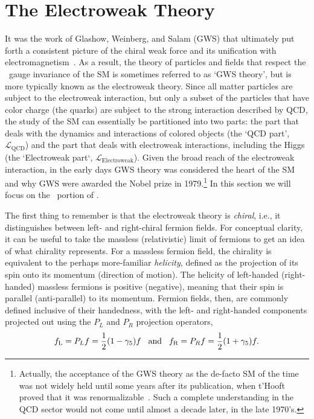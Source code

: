\section{The Electroweak Theory}
\label{sec:ewk_description}

It was the work of Glashow, Weinberg, and Salam (GWS) that ultimately put forth a
consistent picture of the chiral weak force and
its unification with electromagnetism~\cite{Glashow:1961tr,Weinberg:1967tq,Salam:1968rm}.
As a result, the theory of particles and fields that respect the \SUewk~gauge
invariance of the SM is sometimes referred to as `GWS theory', 
but is more typically known as the electroweak theory. Since all matter particles
are subject to the electroweak interaction, but only a subset of the particles  that
have color charge (the quarks) are subject to the strong interaction described by QCD, the study of the SM can essentially
be partitioned into two parts: the part that deals with the dynamics and interactions of
colored objects (the `QCD part', $\mathcal{L}_{\text{QCD}}$) and the part that deals with electroweak
interactions, including the Higgs (the `Electroweak part`, $\mathcal{L}_{\text{Electroweak}}$).
Given the broad reach of the electroweak interaction,
in the early days GWS theory was considered the heart of the SM and why
GWS were awarded the Nobel prize in 1979.\footnote{Actually, the acceptance of the GWS theory as the
de-facto SM of the time was not widely held until some years after its publication, when t'Hooft
proved that it was renormalizable~\cite{tHooft:1971akt,tHooft:1971qjg}.
Such a complete understanding in the QCD sector would not come until almost a decade later, in the late
1970's{\color{red}{Woijkec etc CITE}}.}
In this section we will focus on the \SUewk~portion of \SML.

The first thing to remember is that the electroweak theory is \textit{chiral}, i.e., it distinguishes
between left- and right-chiral fermion fields.
For conceptual clarity, it can be useful to take the massless (relativistic) limit of fermions to
get an idea of what chirality represents.
For a massless fermion field, the chirality is equivalent to the perhaps more-familiar \textit{helicity},
defined as the projection of its spin onto its momentum (direction of motion).
The helicity of left-handed (right-handed) massless fermions is positive (negative), meaning
that their spin is parallel (anti-parallel) to its momentum.
Fermion fields, then, are commonly defined inclusive of their handedness, with the left-
and right-handed components projected out using the $P_L$ and $P_R$ projection operators,
\begin{equation}
	f_{\text{L}} = P_L f = \frac{1}{2}(1- \gamma_5)f \hspace{0.3cm}\text{and}\hspace{0.3cm} f_{\text{R}} = P_R f = \frac{1}{2}(1+\gamma_5)f.
	\label{eq:chiral_projection}
\end{equation}

